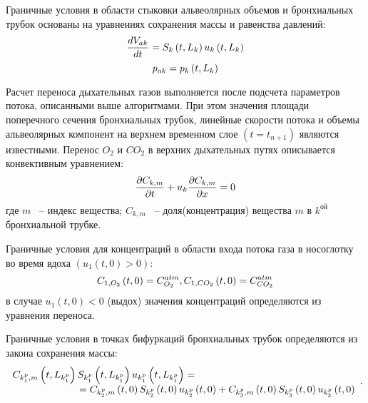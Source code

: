Граничные условия в области стыковки альвеолярных объемов и бронхиальных трубок основаны на уравнениях сохранения массы и равенства давлений:
\begin{equation} 
\frac{dV_{ak} }{dt} =S_{k} \left(t,L_{k} \right)u_{k} \left(t,L_{k} \right)\notag  
\end{equation} 
\begin{equation} 
p_{ak} =p_{k} \left(t,L_{k} \right)\notag 
\end{equation} 

Расчет переноса дыхательных газов выполняется после подсчета параметров потока, описанными выше алгоритмами. При этом значения площади поперечного сечения бронхиальных трубок, линейные скорости потока и объемы альвеолярных компонент на верхнем временном слое $\left(t=t_{n+1} \right)$ являются известными. 
Перенос $O_{2}$ и $CO_{2}$ в верхних дыхательных путях описывается конвективным уравнением: 
\begin{equation}\label{GrindEQ__19_}
\frac{\partial C_{k,m} }{\partial t} +u_{k} \frac{\partial C_{k,m} }{\partial x} =0\notag 
\end{equation} 
где $m$ ~-- индекс вещества; $C_{k,m} $ ~-- доля(концентрация) вещества $m$ в $k^{ой} $ бронхиальной трубке.

Граничные условия для концентраций  в области входа потока газа в носоглотку во время вдоха $\left(u_{1} \left(t,0\right)>0\right)$: 
\begin{equation} 
C_{1,O_{2} } \left(t,0\right)=C_{O_{2} }^{atm} , C_{1,CO_{2} } \left(t,0\right)=C_{CO_{2} }^{atm} \notag
\end{equation} 
в случае $u_{1} \left(t,0\right)<0$ (выдох) значения концентраций определяются из уравнения переноса.

Граничные условия в точках бифуркаций бронхиальных трубок определяются из закона сохранения массы:
\begin{equation} 
\begin{array}{l} {C_{k_{1}^{p} ,m} \left(t,L_{k_{1}^{p} } \right)S_{k_{1}^{p} } \left(t,L_{k_{1}^{p} } \right)u_{k_{1}^{p} } \left(t,L_{k_{1}^{p} } \right)=} \\ {\; \; \; \; \; \; \; \; \; \; \; \; \; \; \; \; \; \; \; \; \; \; \; \; =C_{k_{2}^{p} ,m} \left(t,0\right)S_{k_{2}^{p} } \left(t,0\right)u_{k_{2}^{p} } \left(t,0\right)+C_{k_{3}^{p} ,m} \left(t,0\right)S_{k_{3}^{p} } \left(t,0\right)u_{k_{3}^{p} } \left(t,0\right)} \end{array}.  \notag 
\end{equation} 

